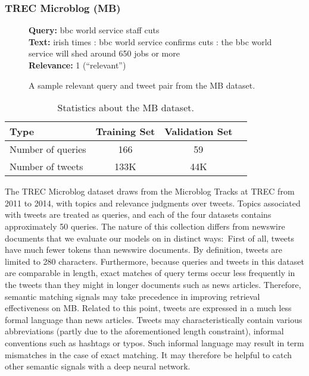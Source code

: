 \subsubsection{TREC Microblog (MB)}

\begin{figure}[b!]
	\begin{framed}
		\centering
    		\textbf{Query:} bbc world service staff cuts \\
    		\textbf{Text:} irish times : bbc world service confirms cuts : the bbc world service will shed around 650 jobs or more \\
    		\textbf{Relevance:} 1 (``relevant'')
	\end{framed}
\label{mb-example}
 \caption{A sample relevant query and tweet pair from the MB dataset.}
\end{figure}

\begin{table}[t]
\vspace{0.2cm}
\centering
\begin{tabular}{lccc}
\toprule
\textbf{Type} \mbox{\hspace{0.5cm}} & \textbf{Training Set} \mbox{\hspace{1.0cm}} & \textbf{Validation Set} \mbox{\hspace{1.0cm}} \\
\toprule
Number of queries & 166 & 59 \\
Number  of tweets & 133K & 44K  \\
\bottomrule
\end{tabular}
\vspace{0.2cm}
\caption{Statistics about the MB dataset.}
\label{tab:mb-stats}
\end{table}

The TREC Microblog dataset draws from the Microblog Tracks at TREC from 2011 to 2014, with topics and relevance judgments over tweets.
Topics associated with tweets are treated as queries, and each of the four datasets contains approximately 50 queries.
The nature of this collection differs from newswire documents that we evaluate our models on in distinct ways:\
First of all, tweets have much fewer tokens than newswire documents.
By definition, tweets are limited to 280 characters.
Furthermore, because queries and tweets in this dataset are comparable in length, exact matches of query terms occur less frequently in the tweets than they might in longer documents such as news articles.
Therefore, semantic matching signals may take precedence in improving retrieval effectiveness on MB.
Related to this point, tweets are expressed in a much less formal language than news articles.
Tweets may characteristically contain various abbreviations (partly due to the aforementioned length constraint), informal conventions such as hashtags or typos.
Such informal language may result in term mismatches in the case of exact matching.
It may therefore be helpful to catch other semantic signals with a deep neural network.

